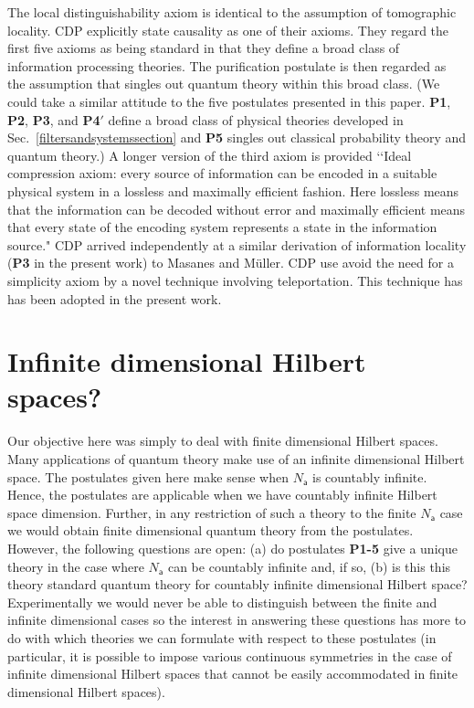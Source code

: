 \documentclass[10pt]{article}
\begin{document}
The local distinguishability axiom is identical to the assumption of tomographic locality.  CDP explicitly state causality as one of their axioms.  They regard the first five axioms as being standard in that they define a broad class of information processing theories.  The purification postulate is then regarded as the assumption that singles out quantum theory within this broad class. (We could take  a similar attitude to the five postulates presented in this paper.  {\bf P1}, {\bf P2}, {\bf P3}, and {\bf P4}$'$ define a broad class of physical theories developed in Sec.\ \ref{filtersandsystemssection} and {\bf P5} singles out classical probability theory and quantum theory.)  A longer version of the third axiom is provided \lq\lq Ideal compression axiom: every source of information can be encoded in a suitable physical system in a lossless and maximally efficient fashion. Here lossless means that the information can be decoded without error and maximally efficient means that every state of the encoding system represents a state in the information source."  CDP arrived independently at a similar derivation of information locality ({\bf P3} in the present work) to Masanes and M\"uller.   CDP use avoid the need for a simplicity axiom by a novel technique involving teleportation.   This technique has has been adopted in the present work.








\section{Infinite dimensional Hilbert spaces?}

Our objective here was simply to deal with finite dimensional Hilbert spaces.  Many applications of quantum theory make use of an infinite dimensional Hilbert space.  The postulates given here make sense when $N_\mathsf{a}$ is countably infinite.  Hence, the postulates are applicable when we have countably infinite Hilbert space dimension.  Further, in any restriction of such a theory to the finite $N_\mathsf{a}$ case we would obtain finite dimensional quantum theory from the postulates.  However, the following questions are open: (a) do postulates {\bf P1-5} give a unique theory in the case where $N_\mathsf{a}$ can be countably infinite and, if so, (b) is this this theory standard quantum theory for countably infinite dimensional Hilbert space?  Experimentally we would never be able to distinguish between the finite and infinite dimensional cases so the interest in answering these questions has more to do with which theories we can formulate with respect to these postulates (in particular, it is possible to impose various continuous symmetries in the case of infinite dimensional Hilbert spaces that cannot be easily accommodated in finite dimensional Hilbert spaces).
\end{document}
